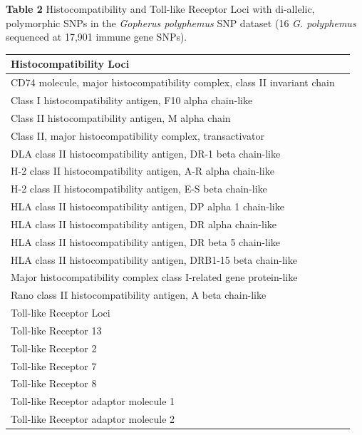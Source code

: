 \documentclass[english]{article}\usepackage[]{graphicx}\usepackage[]{color}
\begin{document}
\pagebreak
\noindent
\textbf{Table 2} Histocompatibility and Toll-like Receptor Loci with di-allelic, polymorphic SNPs in the \textit{Gopherus polyphemus} SNP dataset (16 \textit{G. polyphemus} sequenced at 17,901 immune gene SNPs).\\
\begin{table}[ht]
\centering
\begin{tabular}{ll}
\hline
Histocompatibility Loci \\ 
\hline
CD74 molecule, major histocompatibility complex, class II invariant chain \\ 
Class I histocompatibility antigen, F10 alpha chain-like \\ 
Class II histocompatibility antigen, M alpha chain \\ 
Class II, major histocompatibility complex, transactivator \\ 
DLA class II histocompatibility antigen, DR-1 beta chain-like \\ 
H-2 class II histocompatibility antigen, A-R alpha chain-like \\ 
H-2 class II histocompatibility antigen, E-S beta chain-like \\ 
HLA class II histocompatibility antigen, DP alpha 1 chain-like \\ 
HLA class II histocompatibility antigen, DR alpha chain-like \\ 
HLA class II histocompatibility antigen, DR beta 5 chain-like \\ 
HLA class II histocompatibility antigen, DRB1-15 beta chain-like \\ 
Major histocompatibility complex class I-related gene protein-like \\ 
Rano class II histocompatibility antigen, A beta chain-like \\ 
\hline
Toll-like Receptor Loci \\
\hline
Toll-like Receptor 13 \\ 
Toll-like Receptor 2 \\ 
Toll-like Receptor 7 \\ 
Toll-like Receptor 8 \\ 
Toll-like Receptor adaptor molecule 1 \\ 
Toll-like Receptor adaptor molecule 2 \\ 
\hline
\end{tabular}
\end{table}
\end{document}
